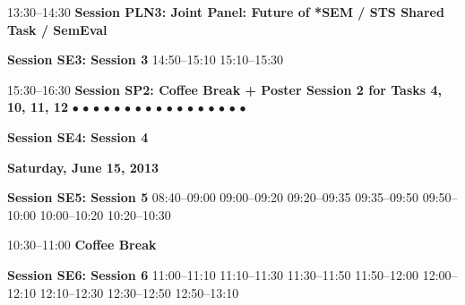 \begin{SingleTrackSchedule}
\vspace{1ex}
13:30--14:30 {\bfseries  Session PLN3: Joint Panel: Future of *SEM / STS Shared Task / SemEval}

\vspace{1ex}
{\bfseries Session SE3: Session 3}
14:50--15:10 
15:10--15:30 

\vspace{1ex}
15:30--16:30 {\bfseries  Session SP2: Coffee Break + Poster Session 2 for Tasks 4, 10, 11, 12}
$\bullet$ 
$\bullet$ 
$\bullet$ 
$\bullet$ 
$\bullet$ 
$\bullet$ 
$\bullet$ 
$\bullet$ 
$\bullet$ 
$\bullet$ 
$\bullet$ 
$\bullet$ 
$\bullet$ 
$\bullet$ 
$\bullet$ 
$\bullet$ 
$\bullet$ 

\vspace{1ex}
\item[] {\bfseries Session SE4: Session 4}

\item[] {\Large\bfseries Saturday, June 15, 2013}\\\vspace{1.5ex}

\vspace{1ex}
{\bfseries Session SE5: Session 5}
08:40--09:00 
09:00--09:20 
09:20--09:35 
09:35--09:50 
09:50--10:00 
10:00--10:20 
10:20--10:30 

\vspace{1ex}
\item[10:30--11:00] {\bfseries  Coffee Break}

\vspace{1ex}
{\bfseries Session SE6: Session 6}
11:00--11:10 
11:10--11:30 
11:30--11:50 
11:50--12:00 
12:00--12:10 
12:10--12:30 
12:30--12:50 
12:50--13:10 


\end{SingleTrackSchedule}
